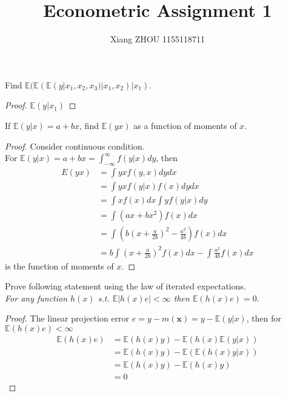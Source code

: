 \documentclass[12pt]{article}
\newenvironment{question}[2][Question]{\begin{trivlist}
\item[\hskip \labelsep {\bfseries #1}\hskip \labelsep {\bfseries #2.}]}{\end{trivlist}}
\begin{document}
 
\title{Econometric Assignment 1}
\author{Xiang ZHOU 1155118711}
\maketitle
 
\begin{question}{2.1}
Find $\mathbb{E}(\mathbb{E}(\mathbb{E}(y|x_1,x_2,x_3)|x_1,x_2)|x_1)$.
\end{question}

\begin{proof}
$\mathbb{E}(y|x_1)$
\end{proof}

\begin{question}{2.2}
If $\mathbb{E}(y|x) = a+bx$, find $\mathbb{E}(yx)$ as a function of moments of $x$. 
\end{question}

\begin{proof}
Consider continuous condition.\\
For $\mathbb{E}(y|x) = a+bx = \int_{-\infty}^{\infty}f(y|x)dy$, then
\begin{align*}
E(yx) &= \int yxf(y,x)dydx  \\
&=\int yxf(y|x)f(x)dydx\\
&=\int xf(x)dx\int yf(y|x)dy\\
&=\int (ax+bx^2) f(x)dx\\
&=\int (b(x+\frac{a}{2b})^2-\frac{a^2}{4b})f(x)dx\\
&=b\int (x+\frac{a}{2b})^2f(x)dx-\int\frac{a^2}{4b}f(x)dx
\end{align*}
is the function of moments of $x$.
\end{proof}

\begin{question}{2.3}
Prove following statement using the law of iterated expectations.\\
\emph{For any function $h(x)$ s.t. $\mathbb{E}|h(x)e|<\infty$ then $\mathbb{E}(h(x)e) = 0$}.
\end{question}

\begin{proof}
The linear projection error $e = y-m(\mathbf{x}) = y - \mathbb{E}(y|x)$, then for $\mathbb{E}(h(x)e)<\infty$
\begin{align*}
\mathbb{E}(h(x)e) &= \mathbb{E}(h(x)y)-\mathbb{E}(h(x)\mathbb{E}(y|x))\\
&= \mathbb{E}(h(x)y)-\mathbb{E}(\mathbb{E}(h(x)y|x))\\
&= \mathbb{E}(h(x)y)-\mathbb{E}(h(x)y)\\
&= 0
\end{align*}
\end{proof}
\end{document}
